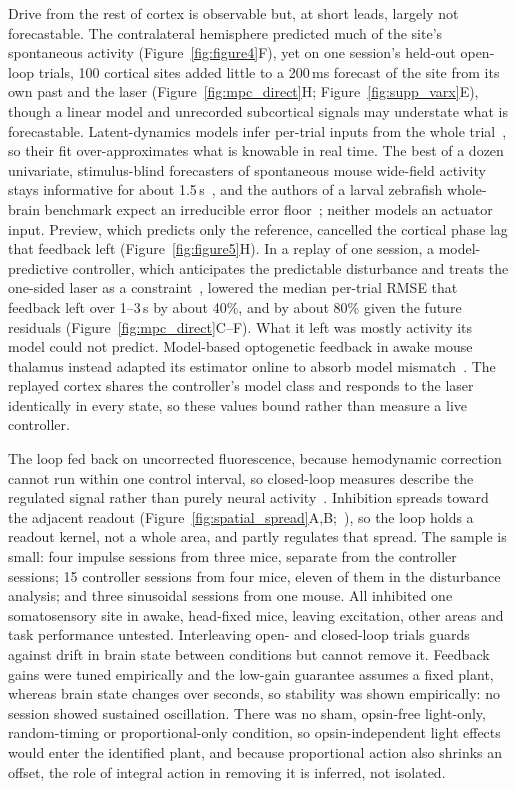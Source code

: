 Drive from the rest of cortex is observable but, at short leads, largely not forecastable. The contralateral hemisphere predicted much of the site's spontaneous activity (Figure~\ref{fig:figure4}F), yet on one session's held-out open-loop trials, 100 cortical sites added little to a 200\,ms forecast of the site from its own past and the laser (Figure~\ref{fig:mpc_direct}H; Figure~\ref{fig:supp_varx}E), though a linear model and unrecorded subcortical signals may understate what is forecastable. Latent-dynamics models infer per-trial inputs from the whole trial~\citep{pandarinath2018lfads}, so their fit over-approximates what is knowable in real time. The best of a dozen univariate, stimulus-blind forecasters of spontaneous mouse wide-field activity stays informative for about 1.5\,s~\citep{lu2025benchmarking}, and the authors of a larval zebrafish whole-brain benchmark expect an irreducible error floor~\citep{lueckmann2025zapbench}; neither models an actuator input. Preview, which predicts only the reference, cancelled the cortical phase lag that feedback left (Figure~\ref{fig:figure5}H). In a replay of one session, a model-predictive controller, which anticipates the predictable disturbance and treats the one-sided laser as a constraint~\citep{mayne2000constrained}, lowered the median per-trial RMSE that feedback left over 1--3\,s by about 40\%, and by about 80\% given the future residuals (Figure~\ref{fig:mpc_direct}C--F). What it left was mostly activity its model could not predict. Model-based optogenetic feedback in awake mouse thalamus instead adapted its estimator online to absorb model mismatch~\citep{bolus2021state}. The replayed cortex shares the controller's model class and responds to the laser identically in every state, so these values bound rather than measure a live controller.

The loop fed back on uncorrected fluorescence, because hemodynamic correction cannot run within one control interval, so closed-loop measures describe the regulated signal rather than purely neural activity~\citep{valley2020separation}. Inhibition spreads toward the adjacent readout (Figure~\ref{fig:spatial_spread}A,B;~\citealp{li2019spatiotemporal}), so the loop holds a readout kernel, not a whole area, and partly regulates that spread. The sample is small: four impulse sessions from three mice, separate from the controller sessions; 15 controller sessions from four mice, eleven of them in the disturbance analysis; and three sinusoidal sessions from one mouse. All inhibited one somatosensory site in awake, head-fixed mice, leaving excitation, other areas and task performance untested. Interleaving open- and closed-loop trials guards against drift in brain state between conditions but cannot remove it. Feedback gains were tuned empirically and the low-gain guarantee assumes a fixed plant, whereas brain state changes over seconds, so stability was shown empirically: no session showed sustained oscillation. There was no sham, opsin-free light-only, random-timing or proportional-only condition, so opsin-independent light effects would enter the identified plant, and because proportional action also shrinks an offset, the role of integral action in removing it is inferred, not isolated.

